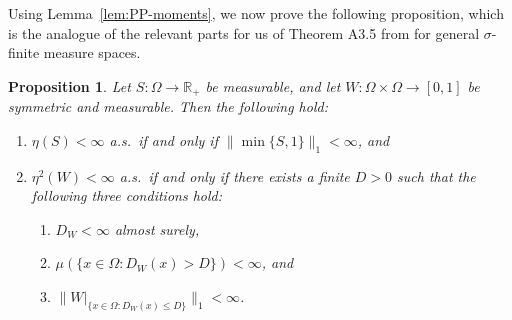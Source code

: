 \documentclass{amsart}
\numberwithin{equation}{section}
\numberwithin{figure}{section}
\newtheorem{proposition}[theorem]{Proposition}
\theoremstyle{definition}
\theoremstyle{remark}
\newcommand{\RR}{\mathbb{R}}
\begin{document}
Using Lemma~\ref{lem:PP-moments}, we now prove the following proposition,
which is the analogue of the relevant parts for us of Theorem A3.5 from
\cite{Kal05} for general $\sigma$-finite measure spaces.

\begin{proposition}\label{prop:as-finite}
Let $S\colon\Omega\to\RR_+$ be measurable, and let
$W\colon\Omega\times\Omega\to [0,1]$ be symmetric and measurable. Then the
following hold:
\begin{enumerate}
\item $\eta(S) <\infty$ a.s.\ if and only if $\|\min\{S,1\}\|_1<\infty$,
    and
\item $\eta^2(W)<\infty$ a.s.\ if and only if there exists a finite $D>0$
    such that the following three conditions hold:
\begin{enumerate}
\item $D_W<\infty$ almost surely,
\item $\mu(\{x\in\Omega: D_W(x)>D\})<\infty$, and
\item $\|W|_{\{x\in\Omega: D_W(x)\leq D\}}\|_1<\infty$.
\end{enumerate}
\end{enumerate}
\end{proposition}
\end{document}
